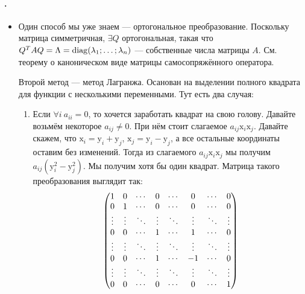\documentclass{article}
\begin{document}
    \paragraph{.}
    \begin{itemize}
        \item[]
        \begin{Comment}
            Один способ мы уже знаем --- ортогональное преобразование. Поскольку матрица симметричная, $\exists Q$ ортогональная, такая что $Q^TAQ=\Lambda=\operatorname{diag}(\lambda_1;\ldots;\lambda_n)$ --- собственные числа матрицы $A$. См. теорему о каноническом виде матрицы самосопряжённого оператора.
        \end{Comment}
        \begin{Comment}
            Второй метод --- метод Лагранжа. Осанован на выделении полного квадрата для функции с несколькими переменными. Тут есть два случая:
            \begin{enumerate}
                \item Если $\forall i~a_{ii}=0$, то хочется заработать квадрат на свою голову. Давайте возьмём некоторое $a_{ij}\neq0$. При нём стоит слагаемое $a_{ij}\mathrm x_i\mathrm x_j$. Давайте скажем, что $\mathrm x_i=\mathrm y_i+\mathrm y_j$, $\mathrm x_j=\mathrm y_i-\mathrm y_j$, а все остальные координаты оставим без изменений. Тогда из слагаемого $a_{ij}\mathrm x_i\mathrm x_j$ мы получим $a_{ij}(\mathrm y_i^2-\mathrm y_j^2)$. Мы получим хотя бы один квадрат.
                Матрица такого преобразования выглядит так:
                $$
                \left(\begin{matrix}
                    1 & 0 & \cdots & 0 & \cdots & 0 & \cdots & 0\\
                    0 & 1 & \cdots & 0 & \cdots & 0 & \cdots & 0\\
                    \vdots & \vdots & \ddots & \vdots & \ddots & \vdots & \ddots & \vdots\\
                    0 & 0 & \cdots & 1 & \cdots & 1 & \cdots & 0\\
                    \vdots & \vdots & \ddots & \vdots & \ddots & \vdots & \ddots & \vdots\\
                    0 & 0 & \cdots & 1 & \cdots & -1 & \cdots & 0\\
                    \vdots & \vdots & \ddots & \vdots & \ddots & \vdots & \ddots & \vdots\\
                    0 & 0 & \cdots & 0 & \cdots & 0 & \cdots & 1\\
\end{matrix}\right)$$
\end{enumerate}
\end{Comment}
\end{itemize}
\end{document}
